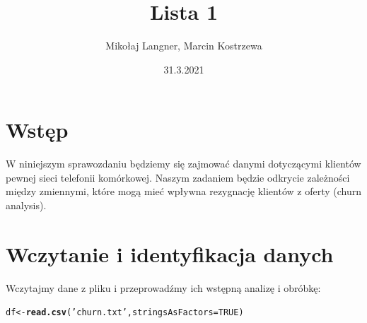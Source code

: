 \documentclass{article}\usepackage[]{graphicx}\usepackage[]{color}
\title{Lista 1}
\author{Mikołaj Langner, Marcin Kostrzewa}
\date{31.3.2021}
\makeatletter
\newcommand{\hlnum}[1]{\textcolor[rgb]{0.686,0.059,0.569}{#1}}%
\newcommand{\hlstr}[1]{\textcolor[rgb]{0.192,0.494,0.8}{#1}}%
\newcommand{\hlstd}[1]{\textcolor[rgb]{0.345,0.345,0.345}{#1}}%
\newcommand{\hlkwb}[1]{\textcolor[rgb]{0.69,0.353,0.396}{#1}}%
\newcommand{\hlkwc}[1]{\textcolor[rgb]{0.333,0.667,0.333}{#1}}%
\newcommand{\hlkwd}[1]{\textcolor[rgb]{0.737,0.353,0.396}{\textbf{#1}}}%
\newenvironment{kframe}{%
 \def\at@end@of@kframe{}%
 \ifinner\ifhmode%
  \def\at@end@of@kframe{\end{minipage}}%
  \begin{minipage}{\columnwidth}%
 \fi\fi%
 \def\FrameCommand##1{\hskip\@totalleftmargin \hskip-\fboxsep
 \colorbox{shadecolor}{##1}\hskip-\fboxsep
     \hskip-\linewidth \hskip-\@totalleftmargin \hskip\columnwidth}%
 \MakeFramed {\advance\hsize-\width
   \@totalleftmargin\z@ \linewidth\hsize
   \@setminipage}}%
 {\par\unskip\endMakeFramed%
 \at@end@of@kframe}
\newenvironment{knitrout}{}{} %
\makeatother
\begin{document}
\maketitle

\section{Wstęp}
W niniejszym sprawozdaniu będziemy się zajmować danymi dotyczącymi klientów pewnej sieci telefonii komórkowej.
Naszym zadaniem będzie odkrycie zależności między zmiennymi, które mogą mieć wpływna rezygnację klientów z oferty (churn analysis).

\section{Wczytanie i identyfikacja danych}
Wczytajmy dane z pliku i przeprowadźmy ich wstępną analizę i obróbkę:

\begin{knitrout}
\color{fgcolor}\begin{kframe}
\begin{alltt}
\hlstd{df} \hlkwb{<-} \hlkwd{read.csv}\hlstd{(}\hlstr{'churn.txt'}\hlstd{,} \hlkwc{stringsAsFactors} \hlstd{=} \hlnum{TRUE}\hlstd{)}
\end{alltt}
\end{kframe}
\end{knitrout}
\end{document}
